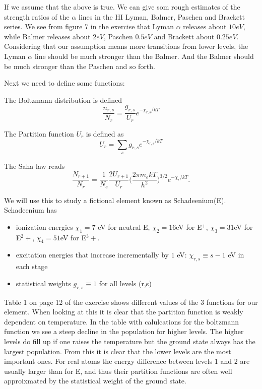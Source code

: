 \documentclass{aa}   %
\begin{document}
If we assume that the above is true. We can give som rough estimates of the strength ratios of the $\alpha$ lines in the HI Lyman, Balmer, Paschen and Brackett series. We see from figure 7 in the exercise that Lyman $\alpha$ releases about $10 eV$, while Balmer releases about $2 eV$, Paschen $0.5eV$ and Brackett about $0.25 eV$. Considering that our assumption means more transitions from lower levels, the Lyman $\alpha$ line should be much stronger than the Balmer. And the Balmer should be much stronger than the Paschen and so forth. 

Next we need to define some functions:

The Boltzmann distribution is defined
\begin{equation}
\frac{n_{r,s}}{N_r} = \frac{g_{r,s}}{U_r} e^{-\chi_{r,s}/kT} 
\end{equation}\label{Boltzmann}

The Partition function $U_r$ is defined as
\begin{equation}
 U_r = \sum_s g_{r,s} e^{-\chi_{r,s}/kT}
\end{equation}\label{Partition}

The Saha law reads
\begin{equation}
 \frac{N_{r+1}}{N_r} = \frac{1}{N_e}\frac{2U_{r+1}}{U_r}\bigg(\frac{2\pi m_e kT}{h^2}\bigg)^{3/2} e^{-\chi_r/kT}.
\end{equation}\label{Saha}

We will use this to study a fictional element known as Schadeenium(E).
Schadeenium has 
\begin{itemize}
\item
ionization energies $\chi_1 = 7$ eV for neutral E, $\chi_2 = 16$eV for E$^+$, $\chi_3 = 31$eV for E$^2+$, $\chi_4 = 51$eV for E$^3+$. 
\item
excitation energies that increase incrementally by $1$ eV: $\chi_{r,s} \equiv s -1$ eV in each stage
\item
statistical weights $g_{r,s} \equiv 1$ for all levels (r,s)
\end{itemize}

Table 1 on page 12 of the exercise shows different values of the 3 functions for our element.
When looking at this it is clear that the partition function is weakly dependent on temperature.
In the table with calulcations for the boltzmann function we see a steep decline in the population for higher levels.
The higher levels do fill up if one raises the temperature but the ground state always has the largest population.
From this it is clear that the lower levels are the most important ones. For real atoms the energy difference between levels 1 and 2 are usually larger than for E, and thus their partition functions are often well approixmated by the statistical weight of the ground state.
\end{document}
